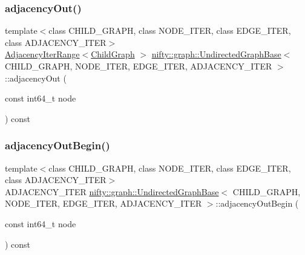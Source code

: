 \mbox{\label{classnifty_1_1graph_1_1UndirectedGraphBase_ab9ce419a67ba4351bb2066a9b85a2b32}} 
\subsubsection{\texorpdfstring{adjacency\+Out()}{adjacencyOut()}}
{\footnotesize\ttfamily template$<$class C\+H\+I\+L\+D\+\_\+\+G\+R\+A\+PH, class N\+O\+D\+E\+\_\+\+I\+T\+ER, class E\+D\+G\+E\+\_\+\+I\+T\+ER, class A\+D\+J\+A\+C\+E\+N\+C\+Y\+\_\+\+I\+T\+ER$>$ \\
\hyperlink{structnifty_1_1graph_1_1UndirectedGraphBase_1_1AdjacencyIterRange}{Adjacency\+Iter\+Range}$<$\hyperlink{classnifty_1_1graph_1_1UndirectedGraphBase_af2541cf9fb91440ff0a7b56dd5a6be29}{Child\+Graph} $>$ \hyperlink{classnifty_1_1graph_1_1UndirectedGraphBase}{nifty\+::graph\+::\+Undirected\+Graph\+Base}$<$ C\+H\+I\+L\+D\+\_\+\+G\+R\+A\+PH, N\+O\+D\+E\+\_\+\+I\+T\+ER, E\+D\+G\+E\+\_\+\+I\+T\+ER, A\+D\+J\+A\+C\+E\+N\+C\+Y\+\_\+\+I\+T\+ER $>$\+::adjacency\+Out (\begin{DoxyParamCaption}\item[{const int64\+\_\+t}]{node }\end{DoxyParamCaption}) const\hspace{0.3cm}{\ttfamily [inline]}}

\mbox{\label{classnifty_1_1graph_1_1UndirectedGraphBase_ad429bbbbb9ee0addfa19bb642f950356}} 
\subsubsection{\texorpdfstring{adjacency\+Out\+Begin()}{adjacencyOutBegin()}}
{\footnotesize\ttfamily template$<$class C\+H\+I\+L\+D\+\_\+\+G\+R\+A\+PH, class N\+O\+D\+E\+\_\+\+I\+T\+ER, class E\+D\+G\+E\+\_\+\+I\+T\+ER, class A\+D\+J\+A\+C\+E\+N\+C\+Y\+\_\+\+I\+T\+ER$>$ \\
A\+D\+J\+A\+C\+E\+N\+C\+Y\+\_\+\+I\+T\+ER \hyperlink{classnifty_1_1graph_1_1UndirectedGraphBase}{nifty\+::graph\+::\+Undirected\+Graph\+Base}$<$ C\+H\+I\+L\+D\+\_\+\+G\+R\+A\+PH, N\+O\+D\+E\+\_\+\+I\+T\+ER, E\+D\+G\+E\+\_\+\+I\+T\+ER, A\+D\+J\+A\+C\+E\+N\+C\+Y\+\_\+\+I\+T\+ER $>$\+::adjacency\+Out\+Begin (\begin{DoxyParamCaption}\item[{const int64\+\_\+t}]{node }\end{DoxyParamCaption}) const\hspace{0.3cm}{\ttfamily [inline]}}

